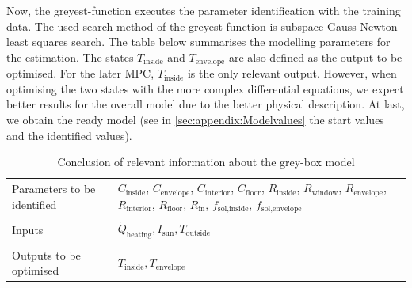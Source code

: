     Now, the greyest-function executes the parameter identification with the training data. The used search method of the greyest-function is subspace Gauss-Newton least squares search. The table below summarises the modelling parameters for the estimation. The states $T_\text{inside}$ and $T_\text{envelope}$ are also defined as the output to be optimised. For the later MPC, $T_\text{inside}$ is the only relevant output. However, when optimising the two states with the more complex differential equations, we expect better results for the overall model due to the better physical description.
    At last, we obtain the ready model (see in \autoref{sec:appendix:Modelvalues} the start values and the identified values).
     
    \begin{table}[]
        \centering
        \begin{tabular}{p{5cm}|p{8cm}}
        Parameters to be identified &  $C_\text{inside}$,  $C_\text{envelope}$,  $C_\text{interior}$, $C_\text{floor}$, $R_\text{inside}$, $R_\text{window}$, $R_\text{envelope}$, $R_\text{interior}$, $R_\text{floor}$, $R_\text{in}$, $f_\text{sol,inside}$, $f_\text{sol,envelope}$ \\
        &\\
        Inputs & $\dot{Q}_\text{heating}, I_\text{sun}, T_\text{outside}$\\
        &\\
        Outputs to be optimised & $T_\text{inside}, T_\text{envelope}$
        \end{tabular}
        \caption{Conclusion of relevant information about the grey-box model}
        \label{tab:Greybox}
    \end{table}
    
